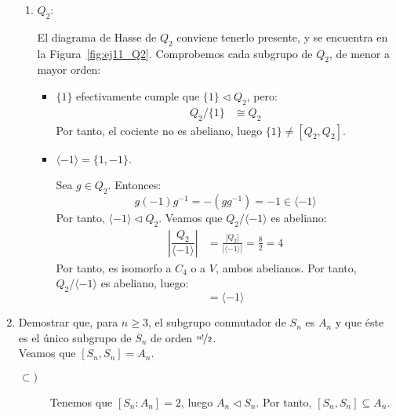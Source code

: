 \begin{ejercicio}
\begin{enumerate}
\begin{enumerate}
            \item $Q_2$:
            
            El diagrama de Hasse de $Q_2$ conviene tenerlo presente, y se encuentra en la Figura~\ref{fig:ej11_Q2}. Comprobemos cada subgrupo de $Q_2$, de menor a mayor orden:
            \begin{itemize}
                \item $\{1\}$ efectivamente cumple que $\{1\}\lhd Q_2$, pero:
                \begin{align*}
                    Q_2/\{1\} &\cong Q_2
                \end{align*}
                Por tanto, el cociente no es abeliano, luego $\{1\}\neq [Q_2,Q_2]$.

                \item $\langle -1\rangle=\{1,-1\}$.
                
                Sea $g\in Q_2$. Entonces:
                \begin{equation*}
                    g(-1)g^{-1} = -(g g^{-1}) = -1\in \langle -1\rangle
                \end{equation*}
                Por tanto, $\langle -1\rangle \lhd Q_2$. Veamos que $Q_2/\langle -1\rangle$ es abeliano:
                \begin{align*}
                    \left|\dfrac{Q_2}{\langle -1\rangle}\right| &= \frac{|Q_2|}{|\langle -1\rangle|} = \frac{8}{2} = 4
                \end{align*}
                Por tanto, es isomorfo a $C_4$ o a $V$, ambos abelianos. Por tanto, $Q_2/\langle -1\rangle$ es abeliano, luego:
                \begin{equation*}
                    [Q_2,Q_2] = \langle -1\rangle
                \end{equation*}
            \end{itemize}
        \end{enumerate}
        \item Demostrar que, para $n\geq 3$, el subgrupo conmutador de $S_n$ es $A_n$ y que éste es el único subgrupo de $S_n$ de orden $\nicefrac{n!}{2}$.\\
        
        Veamos que $[S_n,S_n]=A_n$.
        \begin{description}
            \item[$\subset)$] Tenemos que $[S_n : A_n] = 2$, luego $A_n\lhd S_n$. Por tanto, $[S_n,S_n]\subseteq A_n$.
            

\end{description}
\end{enumerate}
\end{ejercicio}
